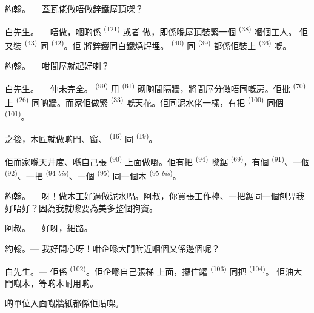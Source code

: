 \textsc{約翰}。--- 蓋瓦佬做唔做鋅鐵屋頂㗎？

\textsc{白先生}。--- 唔做，嗰啲係 \textsuperscript{(121)} 或者
做，即係喺屋頂裝緊一個 \textsuperscript{(38)} 嗰個工人。
佢又裝 \textsuperscript{(43)} 同 \textsuperscript{(42)}。佢
將鋅鐵同白鐵燒焊埋。 \textsuperscript{(40)} 同
\textsuperscript{(39)} 都係佢裝上 \textsuperscript{(36)} 嘅。

\textsc{約翰}。--- 咁間屋就起好喇？

\VUsaut{3.0mm}
\VUsaut{3.0mm}

\textsc{白先生}。--- 仲未完全。 \textsuperscript{(99)} 用
\textsuperscript{(61)} 砌啲間隔牆，將間屋分做唔同嘅房。佢批
\textsuperscript{(70)} 上 \textsuperscript{(26)} 同啲牆。而家佢做緊
 \textsuperscript{(33)} 嘅天花。佢同泥水佬一樣，有把
\textsuperscript{(100)} 同個 \textsuperscript{(101)}。

之後，木匠就做啲門、窗、 \textsuperscript{(16)} 同
\textsuperscript{(19)}。

佢而家喺天井度、喺自己張 \textsuperscript{(90)} 上面做嘢。佢有把
 \textsuperscript{(94)} 嚟鋸 \textsuperscript{(69)}，有個
 \textsuperscript{(91)}、一個 \textsuperscript{(92)}、一把
 \textsuperscript{(94 \textit{bis})}、一個 \textsuperscript{(95)}
同一個木 \textsuperscript{(95 \textit{bis})}。

\textsc{約翰}。--- 呀！做木工好過做泥水喎。阿叔，你買張工作檯、一把鋸同一個刨畀我
好唔好？因為我就嚟要為美多整個狗竇。

\textsc{阿叔}。--- 好呀，細路。

\textsc{約翰}。--- 我好開心呀！咁企喺大門附近嗰個又係邊個呢？

\VUsaut{3.0mm}
\VUsaut{3.0mm}

\textsc{白先生}。--- 佢係 \textsuperscript{(102)}。佢企喺自己張梯
上面，攞住罐 \textsuperscript{(103)} 同把 \textsuperscript{(104)}。
佢油大門嘅木，等啲木耐用啲。

啲單位入面嘅牆紙都係佢貼㗎。

